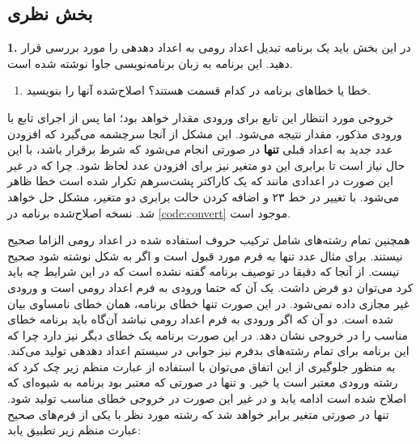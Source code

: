\documentclass{article}
\newenvironment{answer}{}{\\[.3ex]}
\newenvironment{question}[1]{\textbf{#1.} }{}
\newenvironment{qitem}[1]{%
	\begin{enumerate}\item[(#1)]}{\end{enumerate}}
\begin{document}
\subsection*{بخش نظری}
\begin{question}{1}
در این بخش باید یک برنامه تبدیل اعداد رومی به اعداد دهدهی را مورد بررسی قرار دهید. این برنامه به زبان برنامه‌نویسی جاوا نوشته شده است.
\end{question}
\begin{qitem}{a}
خطا یا خطاهای برنامه در کدام قسمت هستند؟ اصلاح‌شده آنها را بنویسید.
\end{qitem}
\begin{answer}
خروجی مورد انتظار این تابع برای ورودی  مقدار  خواهد بود؛ اما پس از اجرای تابع با ورودی مذکور، مقدار  نتیجه می‌شود. این مشکل از آنجا سرچشمه می‌گیرد که افزودن عدد جدید به اعداد قبلی \textbf{تنها} در صورتی انجام می‌شود که شرط  برقرار باشد، با این حال نیاز است تا برابری این دو متغیر نیز برای افزودن عدد لحاظ شود.
چرا که در غیر این صورت در اعدادی مانند  که یک کاراکتر پشت‌سرهم تکرار شده است خطا ظاهر می‌شود.
با تغییر در خط ۲۳ و اضافه کردن حالت برابری دو متغیر، مشکل حل خواهد شد. نسخه اصلاح‌شده برنامه در \autoref{code:convert} موجود است.

همچنین تمام رشته‌های شامل ترکیب حروف استفاده شده در اعداد رومی الزاما صحیح نیستند. برای مثال عدد  تنها به فرم  مورد قبول است و اگر به شکل  نوشته شود صحیح نیست.
از آنجا که دقیقا در توصیف برنامه گفته نشده است که در این شرایط چه باید کرد می‌توان دو فرض داشت. یک آن که حتما ورودی به فرم اعداد رومی است و ورودی‌ غیر مجازی داده نمی‌شود. در این صورت تنها خطای برنامه، همان خطای نامساوی بیان شده است. دو آن که اگر ورودی به فرم اعداد رومی نباشد آن‌گاه باید برنامه خطای مناسب را در خروجی نشان دهد. در این صورت برنامه یک خطای دیگر نیز دارد چرا که این برنامه‌ برای تمام رشته‌های بدفرم نیز جوابی در سیستم اعداد دهدهی تولید می‌‌کند.
به منظور جلوگیری از این اتفاق می‌توان با استفاده از عبارت منظم زیر چک کرد که رشته ورودی معتبر است یا خیر. و تنها در صورتی که معتبر بود برنامه به شیوه‌ای که اصلاح شده است ادامه یابد و در غیر این صورت در خروجی خطای مناسب تولید شود.
تنها در صورتی متغیر  برابر  خواهد شد که رشته مورد نظر با یکی از فرم‌های صحیح عبارت منظم زیر تطبیق یابد:
\end{answer}
\end{document}
